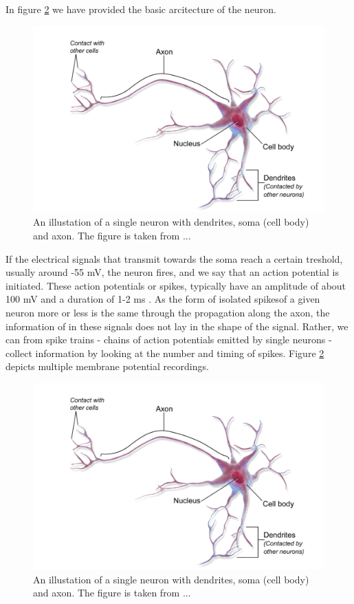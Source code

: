 \documentclass[a4paper, UKenglish, 11pt]{uiomaster}
\begin{document}
In figure \ref{fig:neuron} we have provided the basic arcitecture of the neuron.

\begin{figure}
    \centering
    \includegraphics[width=\linewidth]{figures/neuron.png}
    \caption{An illustation of a single neuron with dendrites, soma (cell body) and axon. The figure is taken from ...}
    \label{fig:neuron}
\end{figure}

If the electrical signals that transmit towards the soma reach a certain treshold, usually around -55 mV, the neuron fires, and we say that an action potential is initiated. These action potentials or spikes, typically have an amplitude of about 100 mV and a duration of 1-2 ms \cite{gerstner2014neuronal}. As the form of isolated spikesof a given neuron more or less is the same through the propagation along the axon, the information of in these signals does not lay in the shape of the signal. Rather, we can from spike trains - chains of action potentials emitted by single neurons - collect information by looking at the number and timing of spikes. Figure \ref{fig:neuron} depicts multiple membrane potential recordings.

\begin{figure}
    \centering
    \includegraphics[width=\linewidth]{figures/neuron.png}
    \caption{An illustation of a single neuron with dendrites, soma (cell body) and axon. The figure is taken from ...}
    \label{fig:neuron}
\end{figure}
\end{document}
